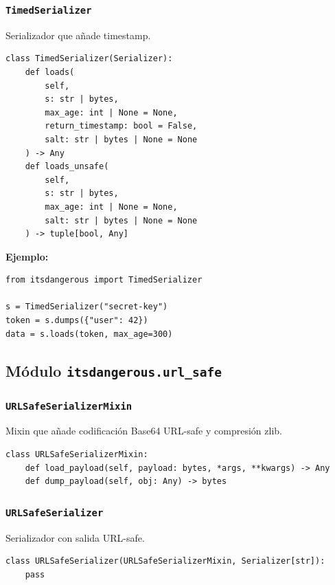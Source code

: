 \documentclass[11pt,a4paper]{article}
\begin{document}
\subsubsection*{\texttt{TimedSerializer}}


Serializador que añade timestamp.


\begin{lstlisting}
class TimedSerializer(Serializer):
    def loads(
        self,
        s: str | bytes,
        max_age: int | None = None,
        return_timestamp: bool = False,
        salt: str | bytes | None = None
    ) -> Any
    def loads_unsafe(
        self,
        s: str | bytes,
        max_age: int | None = None,
        salt: str | bytes | None = None
    ) -> tuple[bool, Any]
\end{lstlisting}


\textbf{Ejemplo:}


\begin{lstlisting}
from itsdangerous import TimedSerializer

s = TimedSerializer("secret-key")
token = s.dumps({"user": 42})
data = s.loads(token, max_age=300)
\end{lstlisting}


\subsection*{Módulo \texttt{itsdangerous.url\_safe}}


\subsubsection*{\texttt{URLSafeSerializerMixin}}


Mixin que añade codificación Base64 URL-safe y compresión zlib.


\begin{lstlisting}
class URLSafeSerializerMixin:
    def load_payload(self, payload: bytes, *args, **kwargs) -> Any
    def dump_payload(self, obj: Any) -> bytes
\end{lstlisting}


\subsubsection*{\texttt{URLSafeSerializer}}


Serializador con salida URL-safe.


\begin{lstlisting}
class URLSafeSerializer(URLSafeSerializerMixin, Serializer[str]):
    pass
\end{lstlisting}
\end{document}
